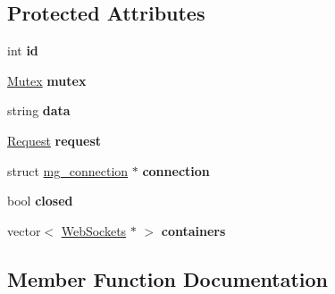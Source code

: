 \subsection*{Protected Attributes}
\begin{DoxyCompactItemize}
\item 
int {\bfseries id}\hypertarget{classMongoose_1_1WebSocket_a48939b1091854a1164f466a92d9a7b2a}{}\label{classMongoose_1_1WebSocket_a48939b1091854a1164f466a92d9a7b2a}

\item 
\hyperlink{classMongoose_1_1Mutex}{Mutex} {\bfseries mutex}\hypertarget{classMongoose_1_1WebSocket_ae91c633ff2c40bc18c88be635ba2d848}{}\label{classMongoose_1_1WebSocket_ae91c633ff2c40bc18c88be635ba2d848}

\item 
string {\bfseries data}\hypertarget{classMongoose_1_1WebSocket_ab92cab32ccec5488a9da4df90a35808b}{}\label{classMongoose_1_1WebSocket_ab92cab32ccec5488a9da4df90a35808b}

\item 
\hyperlink{classMongoose_1_1Request}{Request} {\bfseries request}\hypertarget{classMongoose_1_1WebSocket_a10d2b7cdab18f2383ae61e39dea5787b}{}\label{classMongoose_1_1WebSocket_a10d2b7cdab18f2383ae61e39dea5787b}

\item 
struct \hyperlink{structmg__connection}{mg\+\_\+connection} $\ast$ {\bfseries connection}\hypertarget{classMongoose_1_1WebSocket_a1f09abcb19ece63ba1b3491a23a59097}{}\label{classMongoose_1_1WebSocket_a1f09abcb19ece63ba1b3491a23a59097}

\item 
bool {\bfseries closed}\hypertarget{classMongoose_1_1WebSocket_ac7e471c6d252487c545c376bb18f1689}{}\label{classMongoose_1_1WebSocket_ac7e471c6d252487c545c376bb18f1689}

\item 
vector$<$ \hyperlink{classMongoose_1_1WebSockets}{Web\+Sockets} $\ast$ $>$ {\bfseries containers}\hypertarget{classMongoose_1_1WebSocket_a68eb0522ef09147f27b563ffea9cd6eb}{}\label{classMongoose_1_1WebSocket_a68eb0522ef09147f27b563ffea9cd6eb}

\end{DoxyCompactItemize}


\subsection{Member Function Documentation}
